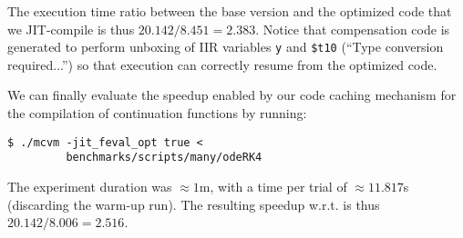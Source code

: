 \noindent The execution time ratio between the base version and the optimized code that we JIT-compile is thus $20.142/8.451=2.383$. Notice that compensation code is generated to perform unboxing of IIR variables {\tt y} and {\tt \$t10} (``Type conversion required...'') so that execution can correctly resume from the optimized code.

We can finally evaluate the speedup enabled by our code caching mechanism for the compilation of continuation functions by running:
\begin{small}
\begin{verbatim}
$ ./mcvm -jit_feval_opt true <
         benchmarks/scripts/many/odeRK4
\end{verbatim}
\end{small}

\noindent The experiment duration was $\approx1$m, with a time per trial of $\approx11.817$s (discarding the warm-up run). The resulting speedup w.r.t. is thus $20.142/8.006=2.516$.

